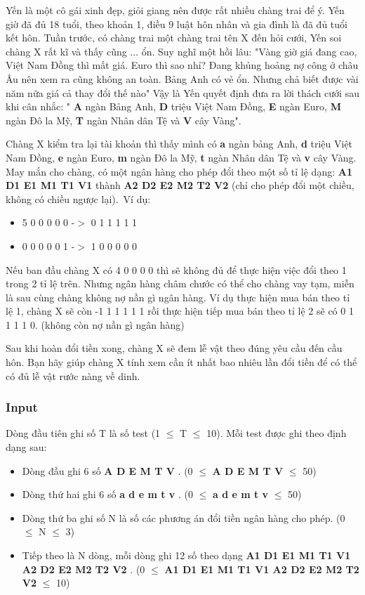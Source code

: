 

Yến là một cô gái xinh đẹp, giỏi giang nên được rất nhiều chàng trai để ý. Yến giờ đã đủ 18 tuổi, theo khoản 1, điều 9 luật hôn nhân và gia đình là đã đủ tuổi kết hôn. Tuần trước, có chàng trai một chàng trai tên X đến hỏi cưới, Yến soi chàng X rất kĩ và thấy cũng ... ổn. Suy nghĩ một hồi lâu: "Vàng giờ giá đang cao, Việt Nam Đồng thì mất giá. Euro thì sao nhỉ? Đang khủng hoảng nợ công ở châu Âu nên xem ra cũng không an toàn. Bảng Anh có vẻ ổn. Nhưng chả biết được vài năm nữa giá cả thay đổi thế nào" Vậy là Yến quyết định đưa ra lời thách cưới sau khi cân nhắc: " \textbf{ A } ngàn Bảng Anh, \textbf{ D } triệu Việt Nam Đồng, \textbf{ E } ngàn Euro, \textbf{ M } ngàn Đô la Mỹ, \textbf{ T } ngàn Nhân dân Tệ và \textbf{ V } cây Vàng".

Chàng X kiểm tra lại tài khoản thì thấy mình có \textbf{ a } ngàn bảng Anh, \textbf{ d } triệu Việt Nam Đồng, \textbf{ e } ngàn Euro, \textbf{ m } ngàn Đô la Mỹ, \textbf{ t } ngàn Nhân dân Tệ và \textbf{ v } cây Vàng. May mắn cho chàng, có một ngân hàng cho phép đổi theo một số tỉ lệ dạng: \textbf{ A1 D1 E1 M1 T1 V1 } thành \textbf{ A2 D2 E2 M2 T2 V2 } (chỉ cho phép đổi một chiều, không có chiều ngược lại). Ví dụ:
\begin{itemize}
	\item 5 0 0 0 0 0 -$>$ 0 1 1 1 1 1
	\item 0 0 0 0 0 1 -$>$ 1 0 0 0 0 0
\end{itemize}

Nếu ban đầu chàng X có 4 0 0 0 0 thì sẽ không đủ để thực hiện việc đổi theo 1 trong 2 tỉ lệ trên. Nhưng ngân hàng châm chước có thể cho chàng vay tạm, miễn là sau cùng chàng không nợ nần gì ngân hàng. Ví dụ thực hiện mua bán theo tỉ lệ 1, chàng X sẽ còn -1 1 1 1 1 1 rồi thực hiện tiếp mua bán theo tỉ lệ 2 sẽ có 0 1 1 1 1 0. (không còn nợ nần gì ngân hàng)

Sau khi hoàn đổi tiền xong, chàng X sẽ đem lễ vật theo đúng yêu cầu đến cầu hôn. Bạn hãy giúp chàng X tính xem cần ít nhất bao nhiêu lần đổi tiền để có thể có đủ lễ vật rước nàng về dinh.

\subsubsection{Input}

Dòng đầu tiên ghi số T là số test (1  $\le$  T  $\le$  10). Mỗi test được ghi theo định dạng sau:
\begin{itemize}
	\item Dòng đầu ghi 6 số \textbf{ A D E M T V } . (0  $\le$  \textbf{ A D E M T V }  $\le$  50)
	\item Dòng thứ hai ghi 6 số \textbf{ a d e m t v } . (0  $\le$  \textbf{ a d e m t v }  $\le$  50)
	\item Dòng thứ ba ghi số N là số các phương án đổi tiền ngân hàng cho phép. (0  $\le$  N  $\le$  3)
	\item Tiếp theo là N dòng, mỗi dòng ghi 12 số theo dạng \textbf{ A1 D1 E1 M1 T1 V1 A2 D2 E2 M2 T2 V2 } . (0  $\le$  \textbf{ A1 D1 E1 M1 T1 V1 A2 D2 E2 M2 T2 V2 }  $\le$  10)
\end{itemize}

